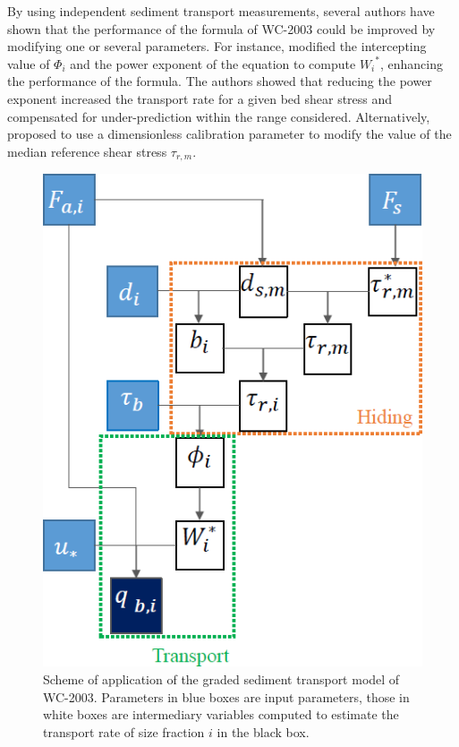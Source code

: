 By using independent sediment transport measurements, several authors \cite[e.g.][]{Recking2015,An2017} have shown that the performance of the formula of WC-2003 could be improved by modifying one or several parameters.
For instance, \cite{Recking2015} modified the intercepting value of $\Phi_i$ and the power exponent of the equation to compute ${W_i}^*$, enhancing the performance of the formula.
The authors showed that reducing the power exponent increased the transport rate for a given bed shear stress and compensated for under-prediction within the range considered.
Alternatively, \cite{An2017} proposed to use a dimensionless calibration parameter to modify the value of the median reference shear stress $\tau_{r,m}$.
\begin{figure}[h!]%
\centering
\includegraphics[scale=0.5]{./graphics/Wilcock_application}%
\caption{Scheme of application of the graded sediment transport model of WC-2003. Parameters in blue boxes are input parameters, those in white boxes are intermediary variables computed to estimate the transport rate of size fraction $i$ in the black box.}%
\label{fig:Wilcock_Application}
\end{figure}

